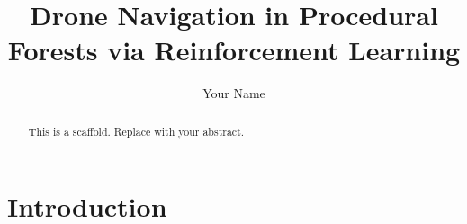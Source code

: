 \documentclass{article}
\title{Drone Navigation in Procedural Forests via Reinforcement Learning}
\author{Your Name}
\begin{document}
    \maketitle
    \begin{abstract}
    This is a scaffold. Replace with your abstract.
    \end{abstract}
    \section{Introduction}
    
\end{document}

